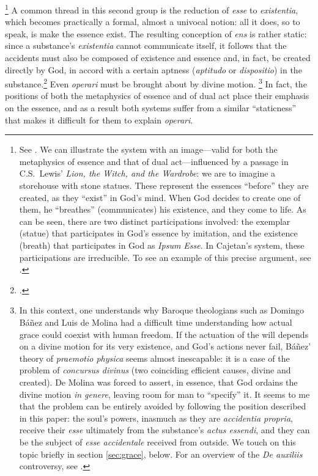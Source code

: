 \footnote{See \cite[274]{gilson:cajetan}. We can illustrate the system with an image---valid for both the metaphysics of essence and that of dual act---influenced by a passage in C.S.~Lewis' \emph{Lion, the Witch, and the Wardrobe}: we are to imagine a storehouse with stone statues. These represent the essences ``before'' they are created, as they ``exist'' in God's mind. When God decides to create one of them, he ``breathes'' (communicates) his existence, and they come to life. As can be seen, there are two distinct participations involved: the exemplar (statue) that participates in God's essence by imitation, and the existence (breath) that participates in God as \emph{Ipsum Esse}. In Cajetan's system, these participations are irreducible. To see an example of this precise argument, see \cite[36--73]{geiger:participation}.} A common thread in this second group is the reduction of \emph{esse} to \emph{existentia}, which becomes practically a formal, almost a univocal notion: all it does, so to speak, is make the essence exist. The resulting conception of \emph{ens} is rather static: since a substance's \emph{existentia} cannot communicate itself, it follows that the accidents must also be composed of existence and essence and, in fact, be created directly by God, in accord with a certain aptness (\emph{aptitudo} or \emph{dispositio}) in the substance.\footcite[See][278]{gilson:cajetan} Even \emph{operari} must be brought about by divine motion.%
%
\footnote{In this context, one understands why Baroque theologians such as Domingo Báñez and Luis de Molina had a difficult time understanding how actual grace could coexist with human freedom. If the actuation of the will depends on a divine motion for its very existence, and God's actions never fail, Báñez' theory of \emph{praemotio physica} seems almost inescapable: it is a case of the problem of \emph{concursus divinus} (two coinciding efficient causes, divine and created). De Molina was forced to assert, in essence, that God ordains the divine motion \emph{in genere}, leaving room for man to ``specify'' it. It seems to me that the problem can be entirely avoided by following the position described in this paper: the soul's powers, inasmuch as they are \emph{accidentia propria}, receive their \emph{esse} ultimately from the substance's \emph{actus essendi}, and they can be the subject of \emph{esse accidentale} received from outside. We touch on this topic briefly in section \ref{sec:grace}, below. For an overview of the \emph{De auxiliis} controversy, see \cite[342--344]{copleston:history:03}.}
%
In fact, the positions of both the metaphysics of essence and of dual act place their emphasis on the essence, and as a result both systems suffer from a similar ``staticness'' that makes it difficult for them to explain \emph{operari}.%

